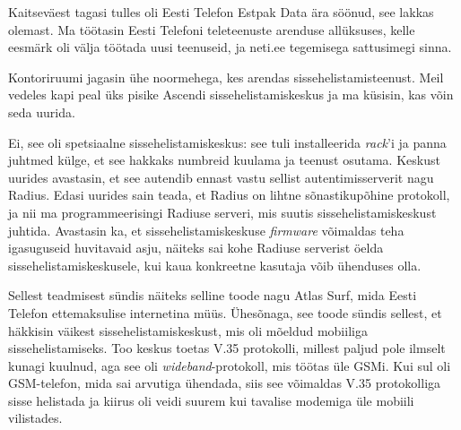 
Kaitseväest tagasi tulles oli Eesti 
Telefon Estpak Data ära söönud, see 
lakkas olemast. Ma töötasin Eesti Telefoni teleteenuste arenduse
allüksuses, kelle eesmärk oli välja töötada uusi teenuseid, ja neti.ee tegemisega sattusimegi sinna. 

Kontoriruumi jagasin ühe noormehega, kes arendas 
sissehelistamisteenust. Meil vedeles kapi peal üks pisike 
Ascendi sissehelistamiskeskus ja ma küsisin, 
kas võin seda uurida.


Ei, see oli spetsiaalne sissehelistamiskeskus: see tuli 
installeerida \emph{rack}'i ja panna juhtmed külge, et see hakkaks numbreid 
kuulama ja teenust osutama. Keskust 
uurides avastasin, et see autendib ennast 
vastu sellist autentimisserverit nagu Radius. Edasi uurides sain teada, et Radius on lihtne sõnastikupõhine protokoll, 
ja nii ma programmeerisingi Radiuse serveri, mis suutis 
sissehelistamiskeskust juhtida. Avastasin ka, et sissehelistamiskeskuse 
\emph{firmware} võimaldas teha igasuguseid huvitavaid asju, näiteks sai kohe Radiuse serverist öelda 
sissehelistamiskeskusele, kui kaua konkreetne kasutaja võib ühenduses olla. 

Sellest teadmisest sündis näiteks selline toode nagu Atlas Surf, mida 
Eesti Telefon ettemaksulise internetina müüs. Ühesõnaga, see toode sündis 
sellest, et häkkisin väikest sissehelistamiskeskust, mis oli 
mõeldud mobiiliga sissehelistamiseks. Too keskus toetas V.35 protokolli, millest paljud pole ilmselt kunagi 
kuulnud, aga see oli \emph{wideband}-protokoll, mis töötas üle GSMi. 
Kui sul oli GSM-telefon, mida sai arvutiga ühendada, siis see võimaldas V.35 protokolliga
sisse helistada ja kiirus oli veidi suurem kui 
tavalise modemiga üle mobiili vilistades. 

